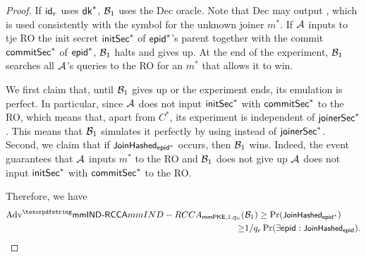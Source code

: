 \begin{proof}
  If $\id_r$ uses $\mmpkesk^*$, $\Bdv[1]$ uses the Dec oracle. Note that Dec may output , which is used consistently with the symbol for the unknown joiner $m^*$. If $\Adv$ inputs to tje RO the init secret $\initSecret^*$ of $\hgnodeid^*$'s parent together with the commit $\commitSecret^*$ of $\hgnodeid^*$, $\Bdv[1]$ halts and gives up. At the end of the experiment, $\Bdv[1]$ searches all $\Adv$'s queries to the RO for an $m^*$ that allows it to win.

  We first claim that, until $\Bdv[1]$ gives up or the experiment ends, its emulation is perfect. In particular, since $\Adv$ does not input $\initSecret^*$ with $\commitSecret^*$ to the RO, which means that, apart from $C^*$, its experiment is independent of $\joinerSecret^*$. This means that $\Bdv[1]$ simulates it perfectly by using  instead of $\joinerSecret^*$.
  Second, we claim that if $\joinerHash_{\hgnodeid^*}$ occurs, then $\Bdv[1]$ wins. Indeed, the event guarantees that $\Adv$ inputs $m^*$ to the RO and $\Bdv[1]$ does not give up
   $\Adv$ does not input $\initSecret^*$ with $\commitSecret^*$ to the RO.

  Therefore, we have
  \begin{align*}\textnormal{Adv}^\mmindrcca_{\mmPKE,1,q_n}(&\Bdv[1]) \geq \Pr(\joinerHash_{\hgnodeid^*}) \\ \geq& 1/q_e\Pr(\exists \hgnodeid : \joinerHash_{\hgnodeid}).
  \end{align*}
\end{proof}

